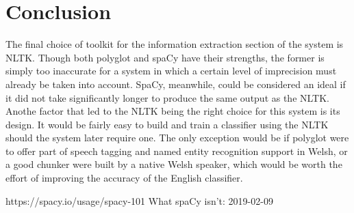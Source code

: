 \documentclass[11pt,a4paper]{article}
\begin{document}
\section{Conclusion}
The final choice of toolkit for the information extraction section of the system is NLTK. Though both polyglot and spaCy have their strengths, the former is simply too inaccurate for a system in which a certain level of imprecision must already be taken into account. SpaCy, meanwhile, could be considered an ideal if it did not take significantly longer to produce the same output as the NLTK. Anothe factor that led to the NLTK being the right choice for this system is its design. It would be fairly easy to build and train a classifier using the NLTK should the system later require one. The only exception would be if polyglot were to offer part of speech tagging and named entity recognition support in Welsh, or a good chunker were built by a native Welsh speaker, which would be worth the effort of improving the accuracy of the English classifier.
\begin{thebibliography}{1}
 https://spacy.io/usage/spacy-101 What spaCy isn't: 2019-02-09
\end{thebibliography}
\end{document}
